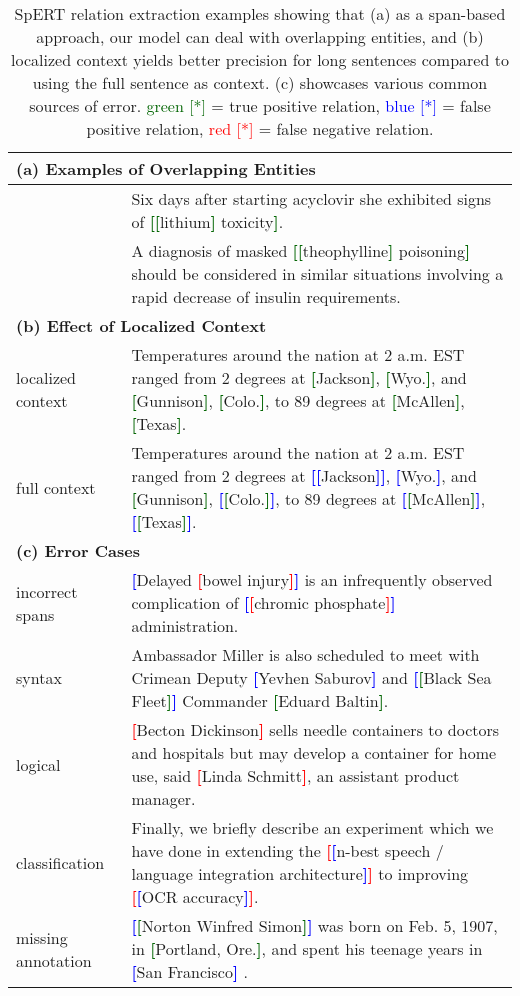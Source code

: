 \documentclass{ecai}
\newcommand\bb[1]{\textbf{\textcolor{blue}{[}}{#1}\textbf{\textcolor{blue}{]}}}
\newcommand\rb[1]{\textbf{\textcolor{red}{[}}{#1}\textbf{\textcolor{red}{]}}}
\newcommand\gb[1]{\textbf{\textcolor{darkgreen}{[}}{#1}\textbf{\textcolor{darkgreen}{]}}}
\begin{document}
\begin{table*}
\centering
\begin{tabular}{l p{14.4cm}}
\toprule
    \multicolumn{2}{l}{{\bf (a) Examples of Overlapping Entities}} \\ \midrule
& Six days after starting acyclovir she exhibited signs of \gb{\gb{lithium} toxicity}.  \\ \midrule
& A diagnosis of masked \gb{\gb{theophylline} poisoning} should be considered in similar situations involving a rapid decrease of insulin requirements. \\
    \midrule
    \midrule
    \multicolumn{2}{l}{{\bf (b) Effect of Localized Context}} \\ \midrule     localized context 
    &  Temperatures around the nation at 2 a.m. EST ranged from 2 degrees at \gb{Jackson}, \gb{Wyo.}, and \gb{Gunnison}, \gb{Colo.}, to 89 degrees at \gb{McAllen}, \gb{Texas}. \\ \midrule
     full context &  Temperatures around the nation at 2 a.m. EST ranged from 2 degrees at \bb{\bb{Jackson}}, \bb{Wyo.}, and \gb{Gunnison}, \bb{\gb{Colo.}}, to 89 degrees at \bb{\gb{McAllen}}, \bb{\gb{Texas}}. \\
    \midrule
    \midrule
    \multicolumn{2}{l}{{\bf (c) Error Cases}} \\ \midrule           incorrect spans & \bb{Delayed \rb{bowel injury}} is an infrequently observed complication of \bb{\rb{chromic phosphate}} administration.\\ \midrule
           


       syntax & Ambassador Miller is also scheduled to meet with Crimean Deputy \bb{Yevhen Saburov} and \bb{\gb{Black Sea Fleet}} Commander \gb{Eduard Baltin}.\\ \midrule
       
      logical &  \rb{Becton Dickinson} sells needle containers to doctors and hospitals but may develop a container for home use, said \rb{Linda Schmitt}, an assistant product manager.\\ \midrule
       
      classification & Finally, we briefly describe an experiment which we have done in extending the  \rb{\bb{n-best speech / language integration architecture}} to improving \rb{\bb{OCR accuracy}}. \\ \midrule
           missing annotation & \bb{\gb{Norton Winfred Simon}} was born on Feb. 5, 1907, in \gb{Portland, Ore.}, and spent his teenage years in \bb{San Francisco} .\\
     \bottomrule
\end{tabular}
\caption[]{SpERT relation extraction examples showing that (a) as a span-based approach, our model can deal with overlapping entities, and (b) localized context yields better precision for long sentences compared to using the full sentence as context. (c) showcases various common sources of error.
\textcolor{darkgreen}{green [*]} = true positive relation, \textcolor{blue}{blue [*]} = false positive relation, \textcolor{red}{red [*]} = false negative relation.} 
\label{table:examples} 
\end{table*}
\end{document}
